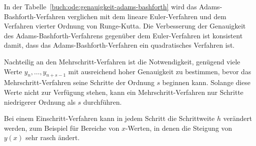In der Tabelle~\ref{buch:ode:genauigkeit-adams-bashforth} wird
das Adams-Bashforth-Verfahren verglichen mit dem lineare Euler-Verfah\-ren 
und dem Verfahren vierter Ordnung von Runge-Kutta.
Die Verbesserung der Genauigkeit des Adams-Bash\-forth-Verfahrens
gegenüber dem Euler-Ver\-fah\-ren ist konsistent damit, dass
das Adams-Bashforth-Verfahren ein quadratisches Verfahren ist.

Nachteilig an den Mehrschritt-Verfahren ist die Notwendigkeit,
genügend viele Werte $y_{n},\dots,y_{n+s-1}$ mit ausreichend
hoher Genauigkeit zu bestimmen, bevor das Mehrschritt-Verfahren
seine Schritte der Ordnung $s$ beginnen kann.
Solange diese Werte nicht zur Verfügung stehen, kann ein Mehrschritt-Verfahren
nur Schritte niedrigerer Ordnung als $s$ durchführen.

Bei einem Einschritt-Verfahren kann in jedem Schritt die Schrittweite $h$
verändert werden, zum Beispiel für Bereiche von $x$-Werten, in denen
die Steigung von $y(x)$ sehr rasch ändert.

